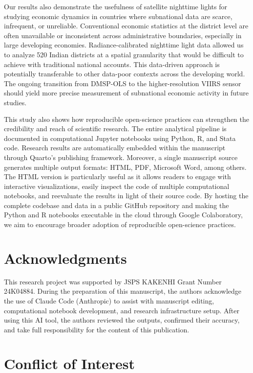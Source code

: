 \documentclass[
  a4paper, 
  twoside,
  review
]{article}
\newcounter{code}
\begin{document}
Our results also demonstrate the usefulness of satellite nighttime
lights for studying economic dynamics in countries where subnational
data are scarce, infrequent, or unreliable. Conventional economic
statistics at the district level are often unavailable or inconsistent
across administrative boundaries, especially in large developing
economies. Radiance-calibrated nighttime light data allowed us to
analyze 520 Indian districts at a spatial granularity that would be
difficult to achieve with traditional national accounts. This
data-driven approach is potentially transferable to other data-poor
contexts across the developing world. The ongoing transition from
DMSP-OLS to the higher-resolution VIIRS sensor should yield more precise
measurement of subnational economic activity in future studies.

This study also shows how reproducible open-science practices can
strengthen the credibility and reach of scientific research. The entire
analytical pipeline is documented in computational Jupyter notebooks
using Python, R, and Stata code. Research results are automatically
embedded within the manuscript through Quarto's publishing framework.
Moreover, a single manuscript source generates multiple output formats:
HTML, PDF, Microsoft Word, among others. The HTML version is
particularly useful as it allows readers to engage with interactive
visualizations, easily inspect the code of multiple computational
notebooks, and reevaluate the results in light of their source code. By
hosting the complete codebase and data in a public GitHub repository and
making the Python and R notebooks executable in the cloud through Google
Colaboratory, we aim to encourage broader adoption of reproducible
open-science practices.

\section{Acknowledgments}\label{acknowledgments}

This research project was supported by JSPS KAKENHI Grant Number
24K04884. During the preparation of this manuscript, the authors
acknowledge the use of Claude Code (Anthropic) to assist with manuscript
editing, computational notebook development, and research infrastructure
setup. After using this AI tool, the authors reviewed the outputs,
confirmed their accuracy, and take full responsibility for the content
of this publication.

\section{Conflict of Interest}\label{conflict-of-interest}
\end{document}
